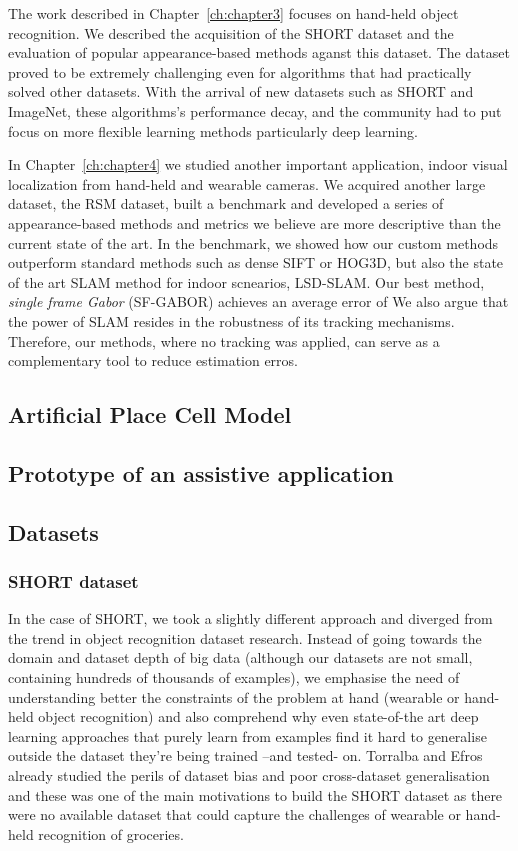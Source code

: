 The work described in Chapter~\ref{ch:chapter3} focuses on hand-held object recognition. We described the acquisition of the SHORT dataset and the evaluation of popular appearance-based methods aganst this dataset. The dataset proved to be extremely challenging even for algorithms that had practically solved other datasets. With the arrival of new datasets such as SHORT and ImageNet, these algorithms's performance decay, and the community had to put focus on more flexible learning methods particularly deep learning.

In Chapter~\ref{ch:chapter4} we studied another important application, indoor visual localization from hand-held and wearable cameras. We acquired another large dataset, the RSM dataset, built a benchmark and developed a series of appearance-based methods and metrics we believe are more descriptive than the current state of the art. In the benchmark, we showed how our custom methods outperform standard methods such as dense SIFT or HOG3D, but also the state of the art SLAM method for indoor scnearios, LSD-SLAM. Our best method, \textit{single frame Gabor} (SF-GABOR) achieves an average error of  We also argue that the power of SLAM resides in the robustness of its tracking mechanisms. Therefore, our methods, where no tracking was applied, can serve as a complementary tool to reduce estimation erros.


\subsection{Artificial Place Cell Model}

\subsection{Prototype of an assistive application}

\subsection{Datasets}

\subsubsection{SHORT dataset}

In the case of SHORT, we took a slightly different approach and diverged from the trend in object recognition dataset research. Instead of going towards the domain and dataset depth of big data (although our datasets are not small, containing hundreds of thousands of examples), we emphasise the need of understanding better the constraints of the problem at hand (wearable or hand-held object recognition) and also comprehend why even state-of-the art deep learning approaches that purely learn from examples find it hard to generalise outside the dataset they're being trained --and tested- on. Torralba and Efros already studied the perils of dataset bias and poor cross-dataset generalisation \cite{torralba2011unbiased} and these was one of the main motivations to build the SHORT dataset as there were no available dataset that could capture the challenges of wearable or hand-held recognition of groceries.

